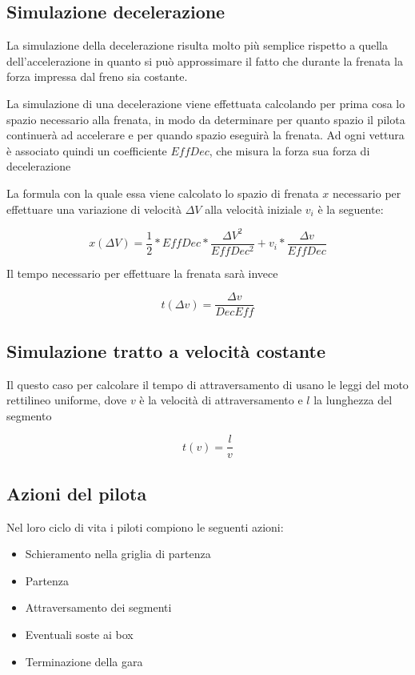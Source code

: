 \documentclass[a4paper,11pt, twoside, openright]{book}
\begin{document}
      \subsection{Simulazione decelerazione}
	La simulazione della decelerazione risulta molto più semplice rispetto a quella dell'accelerazione in quanto
	si può approssimare il fatto che durante la frenata la forza impressa dal freno sia costante.
	
        La simulazione di una decelerazione viene effettuata calcolando per prima cosa lo spazio necessario alla frenata,
	in modo da determinare per quanto spazio il pilota continuerà ad accelerare e per quando spazio 
	eseguirà la frenata. Ad ogni vettura è associato quindi
	un coefficiente $EffDec$, che misura la forza sua forza di decelerazione
	
	La formula con la quale essa viene calcolato lo spazio di frenata $x$ necessario per effettuare una variazione 
	di velocità $\Delta V$ alla velocità iniziale $v_i$ è la seguente:
	
	$$x(\Delta V)=\frac{1}{2}*EffDec*\frac{\Delta V^2}{EffDec^2}+v_i*\frac{\Delta v}{EffDec}$$
	
	Il tempo necessario per effettuare la frenata sarà invece
	
	$$t(\Delta v) = \frac{\Delta v}{DecEff}$$

		
      \subsection{Simulazione tratto a velocità costante}
        
        Il questo caso per calcolare il tempo di attraversamento di usano le leggi del moto rettilineo uniforme,
	dove $v$ è la velocità di attraversamento e $l$ la lunghezza del segmento
	
	$$t(v)= \frac{l}{v}$$
	
      \subsection{Azioni del pilota}
      \label{Azioni del pilota}
        Nel loro ciclo di vita i piloti compiono le seguenti azioni:
	
	\begin{itemize}
	  \item Schieramento nella griglia di partenza
	  \item Partenza
	  \item Attraversamento dei segmenti
	  \item Eventuali soste ai box
	  \item Terminazione della gara
	\end{itemize}
	
\end{document}

